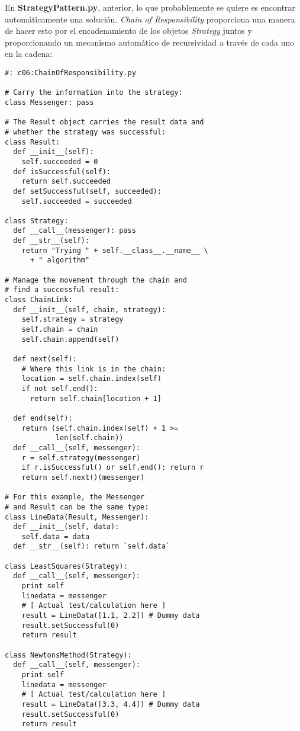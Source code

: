 
En \textbf{StrategyPattern.py}, anterior, lo que probablemente se quiere es encontrar automáticamente una solución. \textit{Chain of Responsibility} proporciona una manera de hacer esto por el encadenamiento de los objetos \textit{Strategy} juntos y proporcionando un mecanismo automático de recursividad a través de cada uno en la cadena:     \newline

\begin{lstlisting} 
#: c06:ChainOfResponsibility.py 

# Carry the information into the strategy: 
class Messenger: pass 

# The Result object carries the result data and 
# whether the strategy was successful: 
class Result: 
  def __init__(self): 
    self.succeeded = 0 
  def isSuccessful(self):  
    return self.succeeded  
  def setSuccessful(self, succeeded):  
    self.succeeded = succeeded 
    
class Strategy: 
  def __call__(messenger): pass 
  def __str__(self):  
    return "Trying " + self.__class__.__name__ \ 
      + " algorithm" 
      
# Manage the movement through the chain and 
# find a successful result: 
class ChainLink: 
  def __init__(self, chain, strategy): 
    self.strategy = strategy 
    self.chain = chain 
    self.chain.append(self) 
    
  def next(self): 
    # Where this link is in the chain: 
    location = self.chain.index(self) 
    if not self.end(): 
      return self.chain[location + 1] 
      
  def end(self): 
    return (self.chain.index(self) + 1 >=  
            len(self.chain)) 
  def __call__(self, messenger): 
    r = self.strategy(messenger) 
    if r.isSuccessful() or self.end(): return r 
    return self.next()(messenger) 
    
# For this example, the Messenger 
# and Result can be the same type: 
class LineData(Result, Messenger): 
  def __init__(self, data): 
    self.data = data 
  def __str__(self): return `self.data` 
  
class LeastSquares(Strategy):   
  def __call__(self, messenger): 
    print self 
    linedata = messenger 
    # [ Actual test/calculation here ] 
    result = LineData([1.1, 2.2]) # Dummy data 
    result.setSuccessful(0) 
    return result 
    
class NewtonsMethod(Strategy): 
  def __call__(self, messenger): 
    print self 
    linedata = messenger 
    # [ Actual test/calculation here ] 
    result = LineData([3.3, 4.4]) # Dummy data 
    result.setSuccessful(0) 
    return result 
    

\end{lstlisting}
